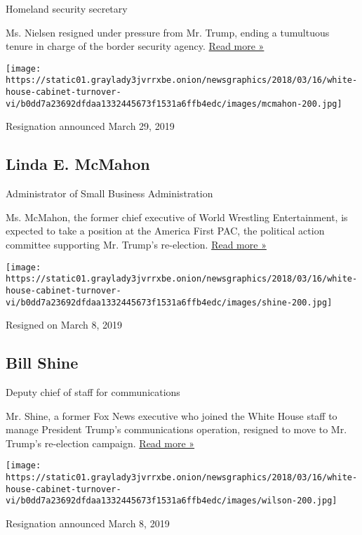 Homeland security secretary

Ms. Nielsen resigned under pressure from Mr. Trump, ending a tumultuous
tenure in charge of the border security agency.
\href{https://www.nytimes3xbfgragh.onion/2019/04/07/us/politics/kirstjen-nielsen-dhs-resigns.html}{Read
more »}

\texttt{[image: https://static01.graylady3jvrrxbe.onion/newsgraphics/2018/03/16/white-house-cabinet-turnover-vi/b0dd7a23692dfdaa1332445673f1531a6ffb4edc/images/mcmahon-200.jpg]}

Resignation announced March 29, 2019

\hypertarget{linda-e-mcmahon}{%
\subsection{Linda E. McMahon}\label{linda-e-mcmahon}}

Administrator of Small Business Administration

Ms. McMahon, the former chief executive of World Wrestling
Entertainment, is expected to take a position at the America First PAC,
the political action committee supporting Mr. Trump's re-election.
\href{https://www.nytimes3xbfgragh.onion/2019/03/29/us/politics/linda-mcmahon-small-business-trump.html}{Read
more »}

\texttt{[image: https://static01.graylady3jvrrxbe.onion/newsgraphics/2018/03/16/white-house-cabinet-turnover-vi/b0dd7a23692dfdaa1332445673f1531a6ffb4edc/images/shine-200.jpg]}

Resigned on March 8, 2019

\hypertarget{bill-shine}{%
\subsection{Bill Shine}\label{bill-shine}}

Deputy chief of staff for communications

Mr. Shine, a former Fox News executive who joined the White House staff
to manage President Trump's communications operation, resigned to move
to Mr. Trump's re-election campaign.
\href{https://www.nytimes3xbfgragh.onion/2019/03/08/us/politics/bill-shine-resigns.html}{Read
more »}

\texttt{[image: https://static01.graylady3jvrrxbe.onion/newsgraphics/2018/03/16/white-house-cabinet-turnover-vi/b0dd7a23692dfdaa1332445673f1531a6ffb4edc/images/wilson-200.jpg]}

Resignation announced March 8, 2019

